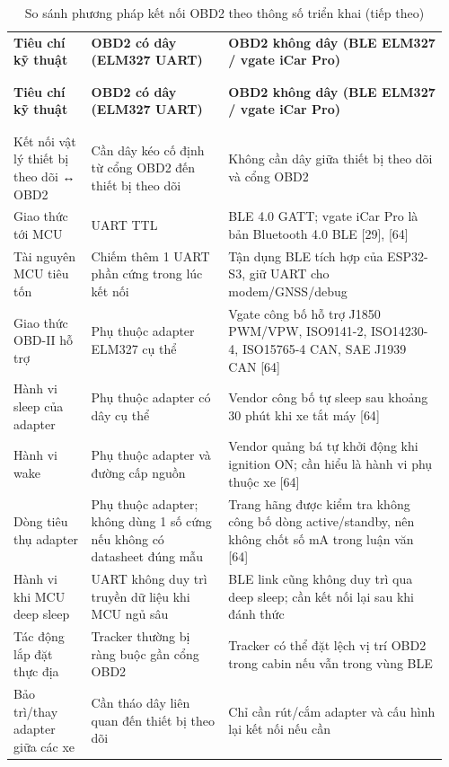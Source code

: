 \documentclass[a4paper]{extarticle}
\newcommand{\thesissettableid}[2]{%
  \renewcommand{\thetable}{#1}%
  \renewcommand{\theHtable}{#2}%
}
\begin{document}
{\thesissettableid{3.5}{tab-ch3-so-sanh-phuong-phap-ket-noi-obd2-theo-thong-so-trien-khai}
\def\LTcaptype{table}
\begin{longtable}{|L{0.177\linewidth}|L{0.303\linewidth}|L{0.484\linewidth}|}
\caption{So sánh phương pháp kết nối OBD2 theo thông số triển khai}\label{tab:ch3-so-sanh-phuong-phap-ket-noi-obd2-theo-thong-so-trien-khai}\\
\hline \textbf{Tiêu chí kỹ thuật} & \textbf{OBD2 có dây (ELM327 UART)} & \textbf{OBD2 không dây (BLE
ELM327 / vgate iCar Pro)} \\
\\\hline
\endfirsthead
\caption[]{So sánh phương pháp kết nối OBD2 theo thông số triển khai (tiếp theo)}\\
\hline \textbf{Tiêu chí kỹ thuật} & \textbf{OBD2 có dây (ELM327 UART)} & \textbf{OBD2 không dây (BLE
ELM327 / vgate iCar Pro)} \\
\\\hline
\endhead
\\\hline
\endfoot
\endlastfoot
Kết nối vật lý thiết bị theo dõi ↔ OBD2 & Cần dây kéo cố định từ cổng OBD2 đến
thiết bị theo dõi & Không cần dây giữa thiết bị theo dõi và cổng OBD2 \\\hline
Giao thức tới MCU & UART TTL & BLE 4.0 GATT; vgate iCar Pro là bản
Bluetooth 4.0 BLE {[}29{]}, {[}64{]} \\\hline
Tài nguyên MCU tiêu tốn & Chiếm thêm 1 UART phần cứng trong lúc kết nối
& Tận dụng BLE tích hợp của ESP32-S3, giữ UART cho modem/GNSS/debug \\\hline
Giao thức OBD-II hỗ trợ & Phụ thuộc adapter ELM327 cụ thể & Vgate công
bố hỗ trợ J1850 PWM/VPW, ISO9141-2, ISO14230-4, ISO15765-4 CAN, SAE
J1939 CAN {[}64{]} \\\hline
Hành vi sleep của adapter & Phụ thuộc adapter có dây cụ thể & Vendor
công bố tự sleep sau khoảng 30 phút khi xe tắt máy {[}64{]} \\\hline
Hành vi wake & Phụ thuộc adapter và đường cấp nguồn & Vendor quảng bá tự
khởi động khi ignition ON; cần hiểu là hành vi phụ thuộc xe {[}64{]} \\\hline
Dòng tiêu thụ adapter & Phụ thuộc adapter; không dùng 1 số cứng nếu
không có datasheet đúng mẫu & Trang hãng được kiểm tra không công bố
dòng active/standby, nên không chốt số mA trong luận văn {[}64{]} \\\hline
Hành vi khi MCU deep sleep & UART không duy trì truyền dữ liệu khi MCU
ngủ sâu & BLE link cũng không duy trì qua deep sleep; cần kết nối lại sau
khi đánh thức \\\hline
Tác động lắp đặt thực địa & Tracker thường bị ràng buộc gần cổng OBD2 &
Tracker có thể đặt lệch vị trí OBD2 trong cabin nếu vẫn trong vùng
BLE \\\hline
Bảo trì/thay adapter giữa các xe & Cần tháo dây liên quan đến thiết bị theo dõi &
Chỉ cần rút/cắm adapter và cấu hình lại kết nối nếu cần \\\hline
\end{longtable}
}
\end{document}
